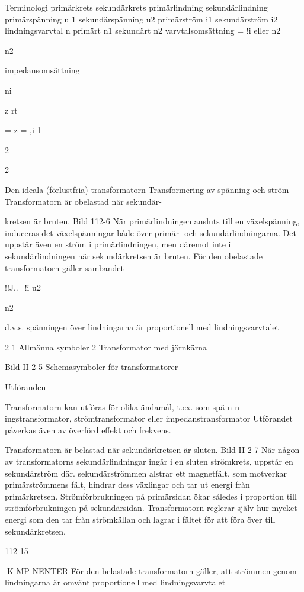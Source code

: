 \documentclass[a4paper,twoside,twocolumn,openright]{book}
\begin{document}
{{{Terminologi
primärkrets
sekundärkrets
primärlindning
sekundärlindning
primärspänning u 1 sekundärspänning u2
primärström i1
sekundärström i2
lindningsvarvtal n primärt n1 sekundärt n2
varvtalsomsättning = !i eller n2

n2

impedansomsättning

ni

z rt

= z = ,i
1

2

2

Den ideala (förlustfria) transformatorn
Transformering av spänning och ström
Transformatorn är obelastad när sekundär-

kretsen är bruten.
Bild 112-6
När primärlindningen ansluts till en växelspänning, induceras det växelspänningar
både över primär- och sekundärlindningarna. Det uppstår även en ström i primärlindningen, men däremot inte i sekundärlindningen när sekundärkretsen är bruten. För
den obelastade transformatorn gäller sambandet

!!J..=!i
u2

n2

d.v.s. spänningen över lindningarna är proportionell med lindningsvarvtalet

2
1 Allmänna symboler
2 Transformator med järnkärna

Bild II 2-5 Schemasymboler för
transformatorer

Utföranden

Transformatorn kan utföras för olika ändamål, t.ex. som
spä n n ingstransformator,
strömtransformator eller
impedanstransformator
Utförandet påverkas även av överförd effekt
och frekvens.

Transformatorn är belastad när sekundärkretsen är sluten.
Bild II 2-7
När någon av transformatorns sekundärlindningar ingår i en sluten strömkrets, uppstår en sekundärström där.
sekundärströmmen alstrar ett magnetfält, som motverkar primärströmmens fält,
hindrar dess växlingar och tar ut energi från
primärkretsen.
Strömförbrukningen på primärsidan ökar
således i proportion till strömförbrukningen
på sekundärsidan. Transformatorn reglerar
själv hur mycket energi som den tar från
strömkällan och lagrar i fältet för att föra över
till sekundärkretsen.

112-15

K MP NENTER
För den belastade transformatorn gäller, att
strömmen genom lindningarna är omvänt
proportionell med lindningsvarvtalet

}}}
\end{document}
